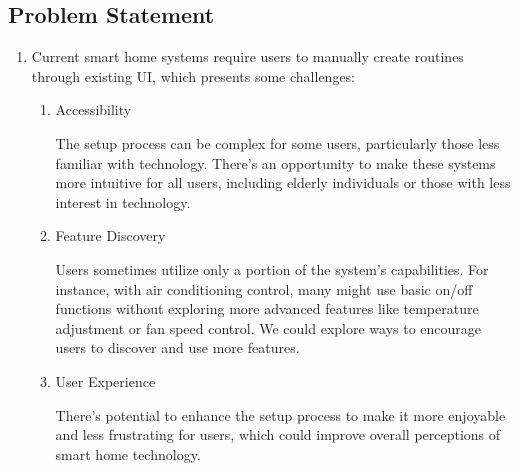\documentclass[conference]{IEEEtran}
\begin{document}
\vspace{0.7em} %

\subsection{Problem Statement}
\vspace{0.5em}

\begin{enumerate}[label=\arabic*]
    \item Current smart home systems require users to manually create routines through existing UI, which presents some challenges:
    \vspace{0.3em}

    \begin{enumerate}[label=\arabic*)]
        \item Accessibility\par
        \vspace{0.3em}
        The setup process can be complex for some users, particularly those less familiar with technology. There's an opportunity to make these systems more intuitive for all users, including elderly individuals or those with less interest in technology.

        \vspace{0.5em}

        \item Feature Discovery\par
        \vspace{0.3em}
        Users sometimes utilize only a portion of the system's capabilities. For instance, with air conditioning control, many might use basic on/off functions without exploring more advanced features like temperature adjustment or fan speed control. We could explore ways to encourage users to discover and use more features.

        \vspace{0.5em}

        \item User Experience\par
        \vspace{0.3em}
        There's potential to enhance the setup process to make it more enjoyable and less frustrating for users, which could improve overall perceptions of smart home technology.

        \vspace{0.5em}


\end{enumerate}
\end{enumerate}
\end{document}
